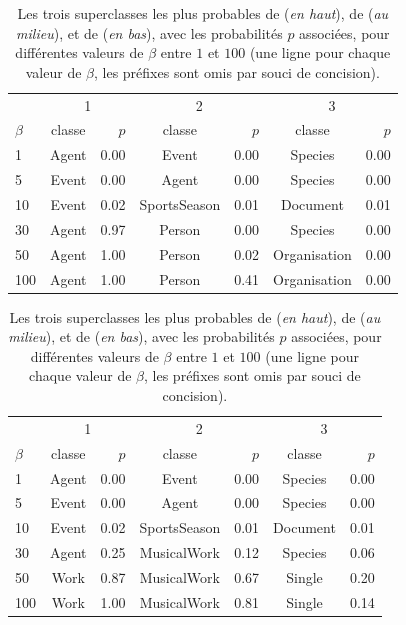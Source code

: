 \begin{table}[h]
    \centering
    \caption[Prédiction de superclasses pour différentes valeurs de $\beta$]{Les trois superclasses les plus probables de  (\textit{en haut}), de  (\textit{au milieu}), et de  (\textit{en bas}), avec les probabilités $p$ associées, pour différentes valeurs de $\beta$ entre $1$ et $100$ (une ligne pour chaque valeur de $\beta$, les préfixes \dbo{} sont omis par souci de concision).}

\begin{tabular}{|l|cr|cr|cr|}
\hline
& \multicolumn{2}{c|}{1} & \multicolumn{2}{c|}{2} & \multicolumn{2}{c|}{3} \\
$\beta$	&	classe	&	$p$	&	classe	&	$p$	&	classe	&	$p$  \\ 
\hline
1 & Agent & 0.00 & Event & 0.00 & Species & 0.00 \\5 & Event & 0.00 & Agent & 0.00 & Species & 0.00 \\10 & Event & 0.02 & SportsSeason & 0.01 & Document & 0.01 \\30 & Agent & 0.97 & Person & 0.00 & Species & 0.00 \\50 & Agent & 1.00 & Person & 0.02 & Organisation & 0.00 \\100 & Agent & 1.00 & Person & 0.41 & Organisation & 0.00 \\
\hline
\end{tabular}

\vspace{2mm}

\begin{tabular}{|l|cr|cr|cr|}
\hline
& \multicolumn{2}{c|}{1} & \multicolumn{2}{c|}{2} & \multicolumn{2}{c|}{3} \\
$\beta$	&	classe	&	$p$	&	classe	&	$p$	&	classe	&	$p$  \\ 
\hline
1 & Agent & 0.00 & Event & 0.00 & Species & 0.00 \\5 & Event & 0.00 & Agent & 0.00 & Species & 0.00 \\10 & Event & 0.02 & SportsSeason & 0.01 & Document & 0.01 \\30 & Agent & 0.25 & MusicalWork & 0.12 & Species & 0.06 \\50 & Work & 0.87 & MusicalWork & 0.67 & Single & 0.20 \\100 & Work & 1.00 & MusicalWork & 0.81 & Single & 0.14 \\
\hline
\end{tabular}

\vspace{2mm}


\end{table}
